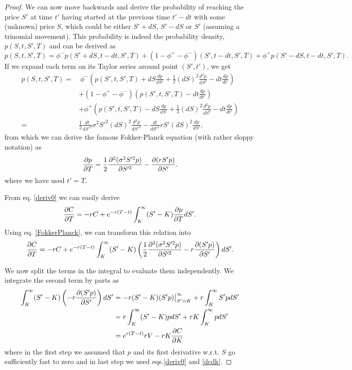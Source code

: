 \begin{proof}
We can now move backwards and derive the probability of reaching the price $S'$ at time $t'$ having started at the previous time $t'-dt$ with some (unknown) price $S$, which could be either $S'+dS$, $S'-dS$ or $S'$ (assuming a trinomial movement). This probability is indeed the probability density, $ p(S,t,S',T) $ and can be derived as
\begin{equation}
p(S,t,S',T)=\phi^-p(S'+dS,t-dt,S',T)+(1-\phi^+-\phi^-)(S',t-dt,S',T)+\phi^+p(S'-dS,t-dt,S',T).
\end{equation}
\noindent If we expand each term on its Taylor series around point $(S',t')$, we get
\begin{equation}
\begin{split}
p(S,t,S',T)=&\ \phi^-\left(p(S',t,S',T)+dS\frac{dp}{dS'}+\frac{1}{2}(dS)^2\frac{d^2p}{dS^2}-dt\frac{dp}{dt'}\right)\\
&+(1-\phi^+-\phi^-)\left(p(S',t,S',T)-dt\frac{dp}{dt'}\right)\\
&+\phi^+\left(p(S',t,S',T)-dS\frac{dp}{dS'}+\frac{1}{2}(dS)^2\frac{d^2p}{dS^2}-dt\frac{dp}{dt'}\right)\\
=&\frac{1}{2}\frac{dt}{dS'^2}\sigma^2S'^2(dS)^2\frac{d^2p}{dS'^2}-\frac{dt}{dS'^2}rS'(dS)^2\frac{dp}{dS'},
\end{split}
\end{equation}
\noindent from which we can derive the famous Fokker-Planck equation (with rather sloppy notation) as
\begin{equation}\label{FokkerPlanck}
\pdv{p}{T}=\frac{1}{2}\pdv{^2(\sigma^2S'^2p)}{S'^2}-\pdv{(rS'p)}{S'}.
\end{equation}
\noindent where we have used $t'=T$.


From eq. \ref{deriv0} we can easily derive
\begin{equation}
\pdv{C}{T}=-rC+e^{-r(T-t)}\int_K^\infty(S'-K)\pdv{p}{T}dS'.
\end{equation}
Using eq. \ref{FokkerPlanck}, we can transform this relation into
\begin{equation}
\pdv{C}{T}=-rC+e^{-r(T-t)}\int_K^\infty(S'-K)\left(\frac{1}{2}\pdv{^2(\sigma^2S'^2p)}{S'^2}-r\pdv{(S'p)}{S'}\right)dS'.
\end{equation}

We now split the terms in the integral to evaluate them independently. We integrate the second term by parts as
\begin{equation}
\begin{split}
\int_K^\infty(S'-K)\left(-r\pdv{(S'p)}{S'}\right)dS'&=-r(S'-K)(S'p)\big|_{S'=K}^\infty+r\int_K^\infty S'p dS'\\
&=r\int_K^\infty (S'-K)p dS'+rK\int_K^\infty p dS'\\
&=e^{r(T-t)}rV-rK\pdv{C}{K}
\end{split}
\end{equation}
\noindent where in the first step we assumed that $p$ and its first derivative w.r.t. $S$ go sufficiently fast to zero and in last step we used eqs.\eqref{deriv0} and \eqref{dcdk}.


\end{proof}
